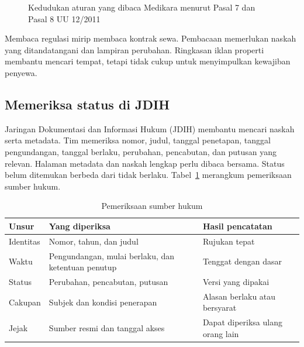 \begin{figure}[!htb]
  \centering
  
  \caption{Kedudukan aturan yang dibaca Medikara menurut Pasal 7 dan Pasal 8 UU 12/2011}
  \label{fig:ch03-hierarki}
\end{figure}

Membaca regulasi mirip membaca kontrak sewa. Pembacaan memerlukan naskah yang ditandatangani
dan lampiran perubahan. Ringkasan iklan properti membantu mencari tempat, tetapi tidak cukup
untuk menyimpulkan kewajiban penyewa.

\subsection*{Memeriksa status di JDIH}

Jaringan Dokumentasi dan Informasi Hukum (JDIH) membantu mencari naskah serta metadata. Tim
memeriksa nomor, judul, tanggal penetapan, tanggal pengundangan, tanggal berlaku, perubahan,
pencabutan, dan putusan yang relevan. Halaman metadata dan naskah lengkap perlu dibaca
bersama. Status belum ditemukan berbeda dari tidak berlaku. Tabel~\ref{tab:ch03-membaca}
merangkum pemeriksaan sumber hukum.

\begin{table}[!htb]
  \centering\small
  \caption{Pemeriksaan sumber hukum}\label{tab:ch03-membaca}
  \begin{tabularx}{\textwidth}{|>{\raggedright\arraybackslash}p{}|>{\raggedright\arraybackslash}X|>{\raggedright\arraybackslash}X|}
    \hline
    \textbf{Unsur} & \textbf{Yang diperiksa} & \textbf{Hasil pencatatan} \\ \hline
    Identitas & Nomor, tahun, dan judul & Rujukan tepat \\ \hline
    Waktu & Pengundangan, mulai berlaku, dan ketentuan penutup & Tenggat dengan dasar \\ \hline
    Status & Perubahan, pencabutan, putusan & Versi yang dipakai \\ \hline
    Cakupan & Subjek dan kondisi penerapan & Alasan berlaku atau bersyarat \\ \hline
    Jejak & Sumber resmi dan tanggal akses & Dapat diperiksa ulang orang lain \\ \hline
  \end{tabularx}
\end{table}

